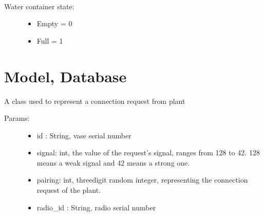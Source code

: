 \documentclass[letterpaper,10pt,english]{sphinxmanual}
\begin{document}

\begin{fulllineitems}
\label{\detokenize{index:model.constant.WaterContainerState}}~\begin{description}
\item[{Water container state:}] \leavevmode\begin{itemize}
\item {} 
Empty = 0

\item {} 
Full = 1

\end{itemize}

\end{description}

\end{fulllineitems}



\chapter{Model, Database}
\label{\detokenize{index:module-model.gio_db}}\label{\detokenize{index:model-database}}

\begin{fulllineitems}
\label{\detokenize{index:model.gio_db.ConnectionRequest}}
A class used to represent a connection request from plant
\begin{description}
\item[{Params:}] \leavevmode\begin{itemize}
\item {} 
id : String, vase serial number

\item {} 
signal: int, the value of the request’s signal, ranges from \sphinxhyphen{}128 to \sphinxhyphen{}42. \sphinxhyphen{}128 means a weak signal and \sphinxhyphen{}42 means a strong one.

\item {} 
pairing: int, three\sphinxhyphen{}digit random integer, representing the connection request of the plant.

\item {} 
radio\_id : String,  radio serial number

\end{itemize}

\end{description}

\end{fulllineitems}
\end{document}
